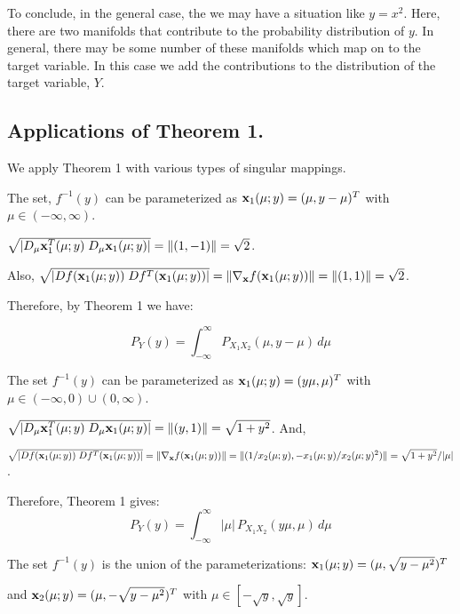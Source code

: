 To conclude, in the general case, the we may have a situation like $y = x^2$. 
Here, there are two manifolds that contribute to the probability distribution of $y$.
In general, there may be some number of these manifolds which map on to the target variable. 
In this case we add the contributions to the distribution of the target variable, $Y$.


\subsection{Applications of Theorem 1.}
We apply Theorem 1 with various types of singular mappings.
\medskip


The set, $f^{-1}(y)$ can be
parameterized as ${\bf x}_1(\mu; y) = (\mu, y - \mu)^T$ with $\mu \in
(-\infty, \infty)$. 

$ \sqrt{|D_{\mu}{\bf x}_1^T(\mu; y)
\; D_{\mu}{\bf x}_1(\mu; y)|}
= \|(1,-1)\| = \sqrt{2}$. 

Also, $\sqrt{|Df({\bf x}_1(\mu; y)) \;
Df^T({\bf x}_1(\mu; y))|} = \| \nabla_{\bf x}
f({\bf x}_1(\mu; y)) \| = \|(1,1)\| = \sqrt{2}$. 

Therefore, by Theorem 1 we have:

$$
P_Y(y) = \int_{-\infty}^{\infty} P_{X_1 X_2}(\mu, y - \mu) \, d\mu
$$

The set $f^{-1}(y)$ can be
parameterized as ${\bf x}_1(\mu; y) = (y\mu, \mu)^T$ with $\mu \in
(-\infty, 0) \cup (0, \infty)$. 

$ \sqrt{|D_{\mu}{\bf x}_1^T(\mu; y)
\; D_{\mu}{\bf x}_1(\mu; y)|} =
\|(y,1)\| = \sqrt{1 + y^2}$. And,

$\sqrt{|Df({\bf x}_1(\mu; y)) \;
Df^T({\bf x}_1(\mu; y))|} = 
\|\nabla_{\bf x}
  f({\bf x}_1(\mu; y)) \| = \|
  (1/x_2(\mu; y), -x_1(\mu; y)/x_2(\mu; y)^2)\| = \sqrt{1 + y^2} / |\mu|$. 

Therefore, Theorem 1 gives:
$$
  P_Y(y) = \int_{-\infty}^{\infty} |\mu| \, P_{X_1 X_2}(y\mu, \mu) \, d\mu
$$


The set $f^{-1}(y)$ is the union of the 
parameterizations: ${\bf x}_1(\mu; y) = (\mu, \sqrt{y - \mu^2})^T$ 

and 
${\bf x}_2(\mu; y) = (\mu, - \sqrt{y - \mu^2})^T$ with $\mu \in
[-\sqrt{y}, \sqrt{y}]$. 
 
